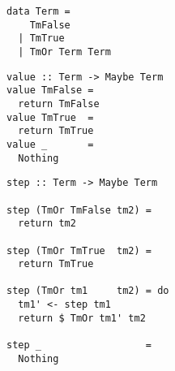 
\begin{frame}[fragile]
\begin{verbatim}
data Term = 
    TmFalse 
  | TmTrue 
  | TmOr Term Term 
\end{verbatim}
\end{frame}

\begin{frame}[fragile]
  \begin{verbatim}
value :: Term -> Maybe Term
value TmFalse = 
  return TmFalse
value TmTrue  = 
  return TmTrue
value _       = 
  Nothing
  \end{verbatim}
\end{frame}

\begin{frame}[fragile]
  \begin{verbatim}
step :: Term -> Maybe Term

step (TmOr TmFalse tm2) = 
  return tm2

step (TmOr TmTrue  tm2) = 
  return TmTrue

step (TmOr tm1     tm2) = do
  tm1' <- step tm1
  return $ TmOr tm1' tm2

step _                  =
  Nothing
  \end{verbatim}
\end{frame}
